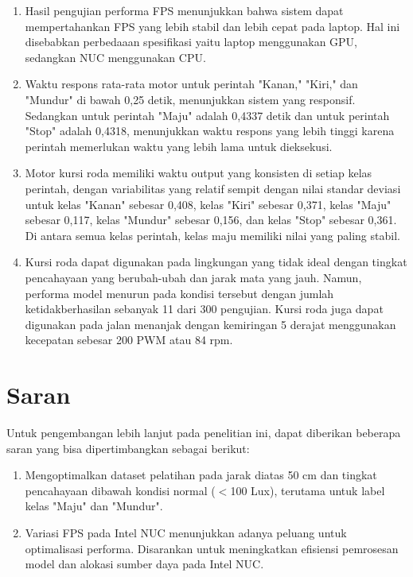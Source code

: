 \begin{enumerate}[nolistsep]
  \item Hasil pengujian performa FPS menunjukkan bahwa sistem dapat mempertahankan FPS yang lebih stabil dan lebih cepat pada laptop. Hal ini disebabkan perbedaaan spesifikasi yaitu laptop menggunakan GPU, sedangkan NUC menggunakan CPU.

  \item Waktu respons rata-rata motor untuk perintah "Kanan," "Kiri," dan "Mundur" di bawah 0,25 detik, menunjukkan sistem yang responsif. Sedangkan untuk perintah "Maju" adalah 0,4337 detik dan untuk perintah "Stop" adalah 0,4318, menunjukkan waktu respons yang lebih tinggi karena perintah memerlukan waktu yang lebih lama untuk dieksekusi.
  
  \item Motor kursi roda memiliki waktu output yang konsisten di setiap kelas perintah, dengan variabilitas yang relatif sempit dengan nilai standar deviasi untuk kelas "Kanan" sebesar 0,408, kelas "Kiri" sebesar 0,371, kelas "Maju" sebesar 0,117, kelas "Mundur" sebesar 0,156, dan kelas "Stop" sebesar 0,361. Di antara semua kelas perintah, kelas maju memiliki nilai yang paling stabil.
  
  \item Kursi roda dapat digunakan pada lingkungan yang tidak ideal dengan tingkat pencahayaan yang berubah-ubah dan jarak mata yang jauh. Namun, performa model menurun pada kondisi tersebut dengan jumlah ketidakberhasilan sebanyak 11 dari 300 pengujian. Kursi roda juga dapat digunakan pada jalan menanjak dengan kemiringan 5 derajat menggunakan kecepatan sebesar 200 PWM atau 84 rpm.

\end{enumerate}

\section{Saran}
\label{chap:saran}

Untuk pengembangan lebih lanjut pada penelitian ini, dapat diberikan beberapa saran yang bisa dipertimbangkan sebagai berikut:

\begin{enumerate}[nolistsep]

  \item Mengoptimalkan dataset pelatihan pada jarak diatas 50 cm dan tingkat pencahayaan dibawah kondisi normal ($<$100 Lux), terutama untuk label kelas "Maju" dan "Mundur".
  
  \item Variasi FPS pada Intel NUC menunjukkan adanya peluang untuk optimalisasi performa. Disarankan untuk meningkatkan efisiensi pemrosesan model dan alokasi sumber daya pada Intel NUC.

\end{enumerate} 